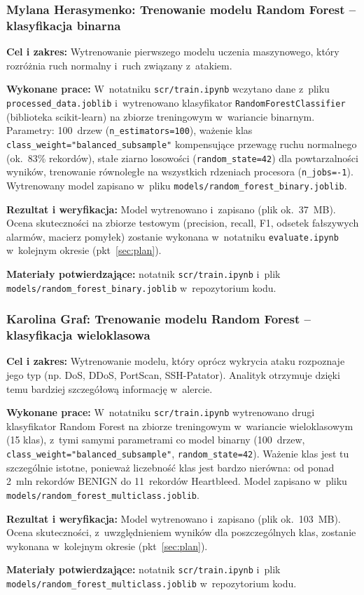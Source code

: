 \documentclass[11pt,a4paper,oneside]{article}
\newcommand{\studentA}{{Karolina Graf}}
\newcommand{\studentC}{{Mylana Herasymenko}}
\begin{document}
\subsubsection{\studentC: Trenowanie modelu Random Forest -- klasyfikacja binarna}\label{zadanie-rf-bin}
\textbf{Cel i zakres:} Wytrenowanie pierwszego modelu uczenia maszynowego, który rozróżnia ruch normalny i~ruch związany z~atakiem.\par
\textbf{Wykonane prace:} W~notatniku \nolinkurl{scr/train.ipynb} wczytano dane z~pliku \nolinkurl{processed_data.joblib} i~wytrenowano klasyfikator \texttt{RandomForestClassifier} (biblioteka scikit-learn) na zbiorze treningowym w~wariancie binarnym. Parametry: 100~drzew (\texttt{n\_estimators=100}), ważenie klas \texttt{class\_weight="balanced\_subsample"} kompensujące przewagę ruchu normalnego (ok.~83\% rekordów), stałe ziarno losowości (\texttt{random\_state=42}) dla powtarzalności wyników, trenowanie równoległe na wszystkich rdzeniach procesora (\texttt{n\_jobs=-1}). Wytrenowany model zapisano w~pliku \nolinkurl{models/random_forest_binary.joblib}.\par
\textbf{Rezultat i weryfikacja:} Model wytrenowano i~zapisano (plik ok.~37~MB). Ocena skuteczności na zbiorze testowym (precision, recall, F1, odsetek fałszywych alarmów, macierz pomyłek) zostanie wykonana w~notatniku \texttt{evaluate.ipynb} w~kolejnym okresie (pkt~\ref{sec:plan}).\par
\textbf{Materiały potwierdzające:} notatnik \nolinkurl{scr/train.ipynb} i~plik \nolinkurl{models/random_forest_binary.joblib} w~repozytorium kodu.

\subsubsection{\studentA: Trenowanie modelu Random Forest -- klasyfikacja wieloklasowa}\label{zadanie-rf-multi}
\textbf{Cel i zakres:} Wytrenowanie modelu, który oprócz wykrycia ataku rozpoznaje jego typ (np. DoS, DDoS, PortScan, SSH-Patator). Analityk otrzymuje dzięki temu bardziej szczegółową informację w~alercie.\par
\textbf{Wykonane prace:} W~notatniku \nolinkurl{scr/train.ipynb} wytrenowano drugi klasyfikator Random Forest na zbiorze treningowym w~wariancie wieloklasowym (15 klas), z~tymi samymi parametrami co model binarny (100~drzew, \texttt{class\_weight="balanced\_subsample"}, \texttt{random\_state=42}). Ważenie klas jest tu szczególnie istotne, ponieważ liczebność klas jest bardzo nierówna: od ponad 2~mln rekordów BENIGN do 11~rekordów Heartbleed. Model zapisano w~pliku \nolinkurl{models/random_forest_multiclass.joblib}.\par
\textbf{Rezultat i weryfikacja:} Model wytrenowano i~zapisano (plik ok.~103~MB). Ocena skuteczności, z~uwzględnieniem wyników dla poszczególnych klas, zostanie wykonana w~kolejnym okresie (pkt~\ref{sec:plan}).\par
\textbf{Materiały potwierdzające:} notatnik \nolinkurl{scr/train.ipynb} i~plik \nolinkurl{models/random_forest_multiclass.joblib} w~repozytorium kodu.
\end{document}
